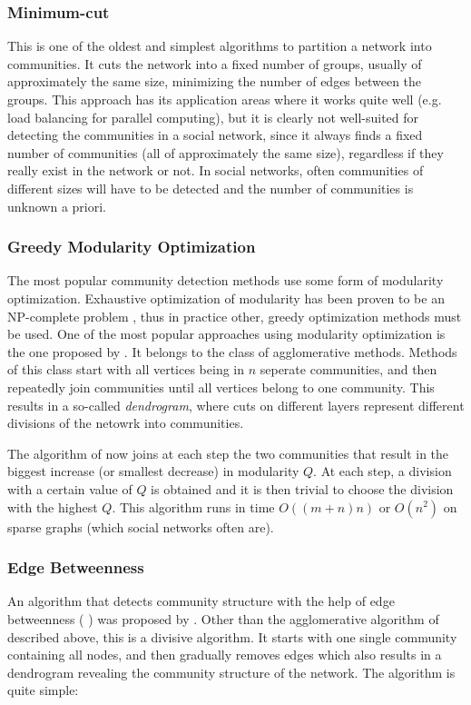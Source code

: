 \subsubsection{Minimum-cut}
\label{ssst:minimumcut} This is one of the oldest and simplest algorithms to partition a network into communities. It cuts the network into a fixed number of groups, usually of approximately the same size, minimizing the number of edges between the groups. This approach has its application areas where it works quite well (e.g. load balancing  for parallel computing), but it is clearly not well-suited for detecting the communities in a social network, since it always finds a fixed number of communities (all of approximately the same size), regardless if they really exist in the network or not. In social networks, often communities of different sizes will have to be detected and the number of communities is unknown a priori.

\subsubsection{Greedy Modularity Optimization}
\label{ssst:modularityoptimization} The most popular community detection methods use some form of modularity optimization. Exhaustive optimization of modularity has been proven to be an NP-complete problem \cite{Brandes_2006}, thus in practice other, greedy optimization methods must be used. One of the most popular approaches using modularity optimization is the one proposed by \cite{Clauset_2004}. It belongs to the class of agglomerative methods. Methods of this class start with all vertices being in $n$ seperate communities, and then repeatedly join communities until all vertices belong to one community. This results in a so-called \textit{dendrogram}, where cuts on different layers represent different divisions of the netowrk into communities.

The algorithm of \cite{Clauset_2004} now joins at each step the two communities that result in the biggest increase (or smallest decrease) in modularity $Q$. At each step, a division with a certain value of $Q$ is obtained and it is then trivial to choose the division with the highest $Q$. This algorithm runs in time $O((m+n)n)$ or $O(n^2)$ on sparse graphs (which social networks often are).

\subsubsection{Edge Betweenness}
\label{ssst:edgebetweenness} An algorithm that detects community structure with the help of edge betweenness (%
) was proposed by \cite{Girvan_2002}. Other than the agglomerative algorithm of \cite{Clauset_2004} described above, this is a divisive algorithm. It starts with one single community containing all nodes, and then gradually removes edges which also results in a dendrogram revealing the community structure of the network. The algorithm is quite simple:

